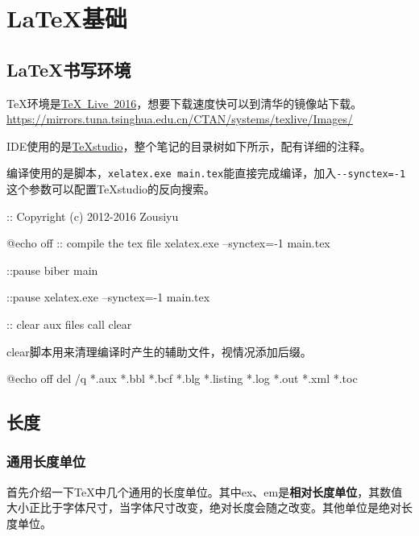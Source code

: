 {\let\clearpage\relax \chapter{\LaTeX 基础}}

\section{\LaTeX 书写环境}

\TeX 环境是\href{http://tug.org/texlive/}{TeX~Live~2016}，想要下载速度快可以到清华的镜像站下载。\url{https://mirrors.tuna.tsinghua.edu.cn/CTAN/systems/texlive/Images/}

IDE使用的是\href{http://texstudio.sourceforge.net/}{TeXstudio}，整个笔记的目录树如下所示，配有详细的注释。


编译使用的是脚本，\lstinline|xelatex.exe main.tex|能直接完成编译，加入\lstinline|--synctex=-1|这个参数可以配置TeXstudio的反向搜索。

\begin{latex}
:: Copyright (c) 2012-2016 Zousiyu

@echo off
:: compile the tex file
xelatex.exe --synctex=-1 main.tex

::pause
biber main

::pause
xelatex.exe --synctex=-1 main.tex

:: clear aux files
call clear
\end{latex}

clear脚本用来清理编译时产生的辅助文件，视情况添加后缀。

\begin{latex}
@echo off
del /q *.aux *.bbl *.bcf *.blg *.listing *.log *.out *.xml *.toc
\end{latex}

\section{长度}
\subsection*{通用长度单位}
首先介绍一下\TeX 中几个通用的长度单位。其中ex、em是\textbf{相对长度单位}，其数值大小正比于字体尺寸，当字体尺寸改变，绝对长度会随之改变。其他单位是绝对长度单位。

